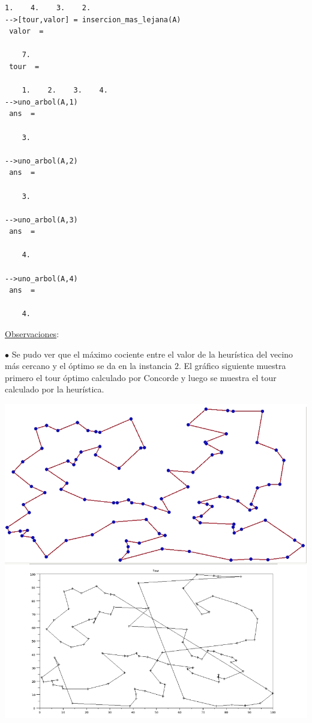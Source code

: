 \documentclass[10pt,a4paper]{report}
\begin{document}
\begin{enumerate}
\begin{lstlisting}[frame=single]
    1.    4.    3.    2.  
-->[tour,valor] = insercion_mas_lejana(A)
 valor  =
 
    7.  
 tour  =
 
    1.    2.    3.    4.
-->uno_arbol(A,1)
 ans  =
 
    3.  
 
-->uno_arbol(A,2)
 ans  =
 
    3.  
 
-->uno_arbol(A,3)
 ans  =
 
    4.  
 
-->uno_arbol(A,4)
 ans  =
 
    4.    
\end{lstlisting}
\end{enumerate}

\newpage
\setcounter{page}{5}
\begin{flushleft}
\underline{Observaciones}:\\
\end{flushleft}
$\bullet$ Se pudo ver que el m\'aximo cociente entre el valor de la heur\'istica del vecino m\'as cercano y el \'optimo se da en la instancia $2$. El gr\'afico siguiente muestra primero el tour \'optimo calculado por Concorde y luego se muestra el tour calculado por la heur\'istica. \\
\begin{center}
\includegraphics[scale=0.5]{instancia2TourOptTourVMC.jpg}
\end{center}
\end{document}
